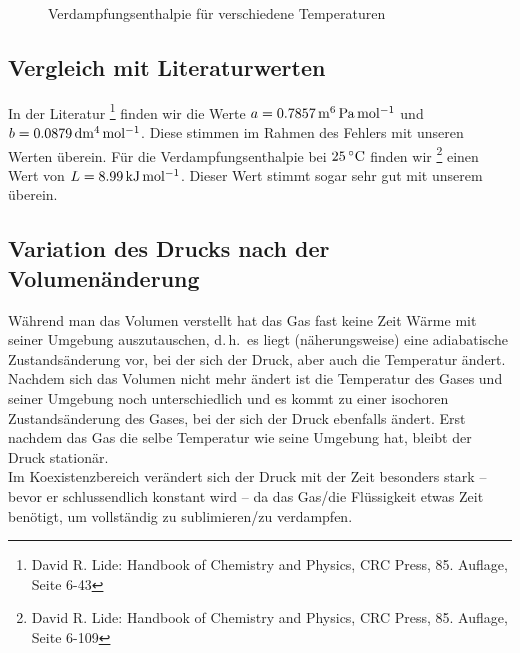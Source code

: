 \begin{figure}
    
    \caption{Verdampfungsenthalpie für verschiedene Temperaturen}
    \label{diag:L}
\end{figure}


\subsection{Vergleich mit Literaturwerten}

In der Literatur%
\footnote{David R. Lide: Handbook of Chemistry and Physics, CRC Press, 85. Auflage, Seite 6-43}
finden wir die Werte $a = \unit[0.7857]{m^6\, Pa\, mol^{-1}}$ und $b = \unit[0.0879]{dm^4\, mol^{-1}}$. Diese stimmen im Rahmen des Fehlers mit unseren Werten überein. Für die Verdampfungsenthalpie bei $\unit[25]{ ^\circ C}$ finden wir%
\footnote{David R. Lide: Handbook of Chemistry and Physics, CRC Press, 85. Auflage, Seite 6-109}
einen Wert von $L = \unit[8.99]{kJ\, mol^{-1}}$. Dieser Wert stimmt sogar sehr gut mit unserem überein.

\subsection{Variation des Drucks nach der Volumenänderung}

Während man das Volumen verstellt hat das Gas fast keine Zeit Wärme mit seiner Umgebung auszutauschen, d.\,h.\ es liegt (näherungsweise) eine adiabatische Zustandsänderung vor, bei der sich der Druck, aber auch die Temperatur ändert. Nachdem sich das Volumen nicht mehr ändert ist die Temperatur des Gases und seiner Umgebung noch unterschiedlich und es kommt zu einer isochoren Zustandsänderung des Gases, bei der sich der Druck ebenfalls ändert. Erst nachdem das Gas die selbe Temperatur wie seine Umgebung hat, bleibt der Druck stationär.\\
Im Koexistenzbereich verändert sich der Druck mit der Zeit besonders stark -- bevor er schlussendlich konstant wird -- da das Gas/die Flüssigkeit etwas Zeit benötigt, um vollständig zu sublimieren/zu verdampfen.

